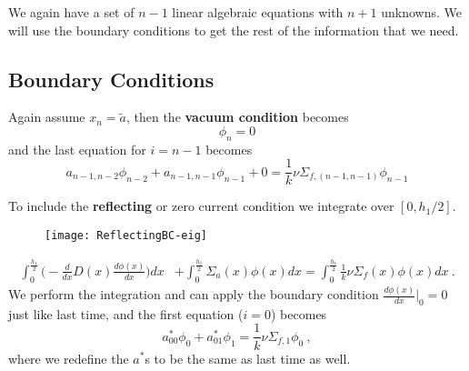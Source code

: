 \documentclass[12pt]{article}
\begin{document}
We again have a set of $n-1$ linear algebraic equations with $n+1$ unknowns. We will use the boundary conditions to get the rest of the information that we need.


\subsection*{Boundary Conditions}

Again assume $x_n = \tilde{a}$, then the \textbf{vacuum condition} becomes
\[\phi_n = 0\]
and the last equation for $i=n-1$ becomes
\[a_{n-1,n-2} \phi_{n-2} + a_{n-1,n-1}\phi_{n-1} + 0 = \frac{1}{k}\nu\Sigma_{f,(n-1,n-1)} \phi_{n-1}\]

To include the \textbf{reflecting} or zero current condition we integrate over $[0, h_{1}/2]$.
%
\begin{figure}[h!]
\texttt{[image: ReflectingBC-eig]}
\end{figure}
%
\begin{align}
\int_{0}^{\frac{h_{1}}{2}} \biggl(-\frac{d}{dx}D(x)\frac{d \phi(x)}{dx}\biggr) dx &+ \int_{0}^{\frac{h_{1}}{2}} \Sigma_a(x) \phi(x) dx = \int_{0}^{\frac{h_{1}}{2}} \frac{1}{k}\nu \Sigma_f(x) \phi(x) dx \:. \nonumber %
%
\end{align}
%
We perform the integration and can apply the boundary condition $\frac{d \phi(x)}{dx}\big|_{0} = 0$ just like last time, 
%
and the first equation ($i=0$) becomes
\[a_{00}^*\phi_0 + a_{01}^* \phi_1 = \frac{1}{k}\nu\Sigma_{f,1} \phi_0 \:,\]
%
where we redefine the $a^*$s to be the same as last time as well.%
%
\end{document}
